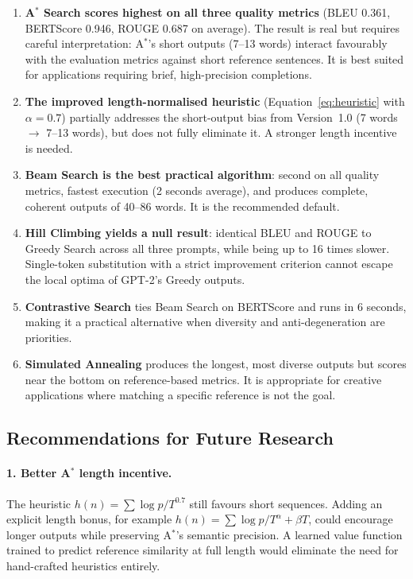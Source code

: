 \documentclass[12pt]{article}
\begin{document}
	\begin{enumerate}[leftmargin=*]
		\item \textbf{A$^*$ Search scores highest on all three quality metrics} (BLEU 0.361, BERTScore 0.946, ROUGE 0.687 on average). The result is real but requires careful interpretation: A$^*$'s short outputs (7--13 words) interact favourably with the evaluation metrics against short reference sentences. It is best suited for applications requiring brief, high-precision completions.
		
		\item \textbf{The improved length-normalised heuristic} (Equation~\ref{eq:heuristic} with $\alpha = 0.7$) partially addresses the short-output bias from Version~1.0 (7 words $\to$ 7--13 words), but does not fully eliminate it. A stronger length incentive is needed.
		
		\item \textbf{Beam Search is the best practical algorithm}: second on all quality metrics, fastest execution (2 seconds average), and produces complete, coherent outputs of 40--86 words. It is the recommended default.
		
		\item \textbf{Hill Climbing yields a null result}: identical BLEU and ROUGE to Greedy Search across all three prompts, while being up to 16 times slower. Single-token substitution with a strict improvement criterion cannot escape the local optima of GPT-2's Greedy outputs.
		
		\item \textbf{Contrastive Search} ties Beam Search on BERTScore and runs in 6 seconds, making it a practical alternative when diversity and anti-degeneration are priorities.
		
		\item \textbf{Simulated Annealing} produces the longest, most diverse outputs but scores near the bottom on reference-based metrics. It is appropriate for creative applications where matching a specific reference is not the goal.
	\end{enumerate}
	
	\subsection{Recommendations for Future Research}
	
	\paragraph{1. Better A$^*$ length incentive.}
	The heuristic $h(n) = \sum \log p / T^{0.7}$ still favours short sequences. Adding an explicit length bonus, for example $h(n) = \sum \log p / T^{\alpha} + \beta T$, could encourage longer outputs while preserving A$^*$'s semantic precision. A learned value function trained to predict reference similarity at full length would eliminate the need for hand-crafted heuristics entirely.
	
\end{document}
